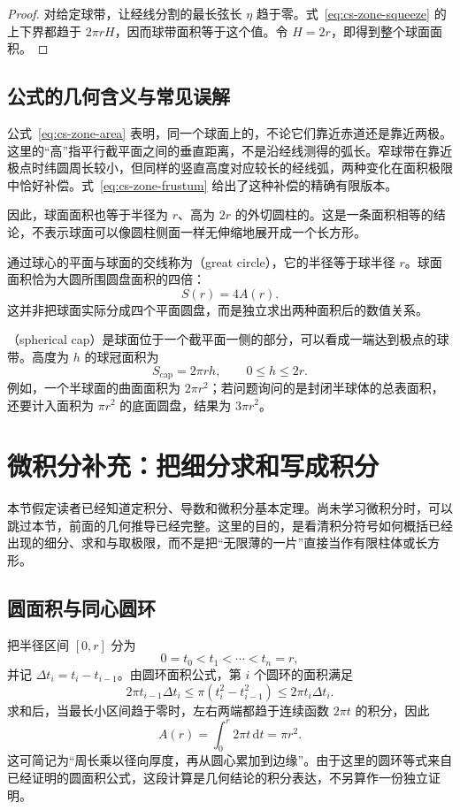 \documentclass[UTF8]{ctexart}
\begin{document}
\begin{proof}
对给定球带，让经线分割的最长弦长 $\eta$ 趋于零。式~\eqref{eq:cs-zone-squeeze} 的上下界都趋于 $2\pi rH$，因而球带面积等于这个值。令 $H=2r$，即得到整个球面面积。
\end{proof}

\subsection{公式的几何含义与常见误解}

公式~\eqref{eq:cs-zone-area} 表明，同一个球面上的，不论它们靠近赤道还是靠近两极。这里的“高”指平行截平面之间的垂直距离，不是沿经线测得的弧长。窄球带在靠近极点时纬圆周长较小，但同样的竖直高度对应较长的经线弧，两种变化在面积极限中恰好补偿。式~\eqref{eq:cs-zone-frustum} 给出了这种补偿的精确有限版本。

因此，球面面积也等于半径为 $r$、高为 $2r$ 的外切圆柱的。这是一条面积相等的结论，不表示球面可以像圆柱侧面一样无伸缩地展开成一个长方形。

通过球心的平面与球面的交线称为（great circle），它的半径等于球半径 $r$。球面面积恰为大圆所围圆盘面积的四倍：
\[
  S(r)=4A(r).
\]
这并非把球面实际分成四个平面圆盘，而是独立求出两种面积后的数值关系。

（spherical cap）是球面位于一个截平面一侧的部分，可以看成一端达到极点的球带。高度为 $h$ 的球冠面积为
\begin{equation}\label{eq:cs-cap-area}
  S_{\mathrm{cap}}=2\pi rh,\qquad 0\leq h\leq2r.
\end{equation}
例如，一个半球面的曲面面积为 $2\pi r^2$；若问题询问的是封闭半球体的总表面积，还要计入面积为 $\pi r^2$ 的底面圆盘，结果为 $3\pi r^2$。

\section{微积分补充：把细分求和写成积分}
\label{sec:cs-calculus}

本节假定读者已经知道定积分、导数和微积分基本定理。尚未学习微积分时，可以跳过本节，前面的几何推导已经完整。这里的目的，是看清积分符号如何概括已经出现的细分、求和与取极限，而不是把“无限薄的一片”直接当作有限柱体或长方形。

\subsection{圆面积与同心圆环}

把半径区间 $[0,r]$ 分为
\[
  0=t_0<t_1<\cdots<t_n=r,
\]
并记 $\Delta t_i=t_i-t_{i-1}$。由圆环面积公式，第 $i$ 个圆环的面积满足
\[
  2\pi t_{i-1}\Delta t_i
  \leq\pi(t_i^2-t_{i-1}^2)
  \leq2\pi t_i\Delta t_i.
\]
求和后，当最长小区间趋于零时，左右两端都趋于连续函数 $2\pi t$ 的积分，因此
\begin{equation}\label{eq:cs-area-integral}
  A(r)=\int_0^r2\pi t\,\mathrm{d}t=\pi r^2.
\end{equation}
这可简记为“周长乘以径向厚度，再从圆心累加到边缘”。由于这里的圆环等式来自已经证明的圆面积公式，这段计算是几何结论的积分表达，不另算作一份独立证明。
\end{document}
